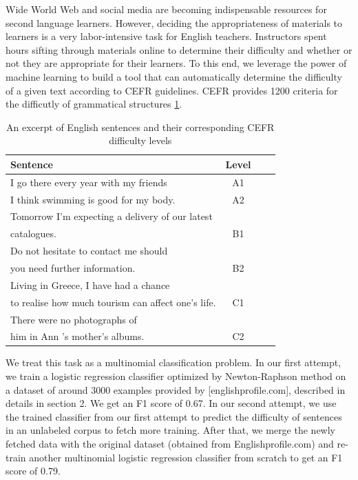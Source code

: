 Wide World Web and social media are becoming indispensable resources for second language learners. However, deciding the appropriateness of materials to learners is a very labor-intensive task for English teachers. Instructors spent hours sifting through materials online to determine their difficulty and whether or not they are appropriate for their learners. To this end, we leverage the power of machine learning to build a tool that can automatically determine the difficulty of a given text according to CEFR guidelines. 
CEFR provides 1200 criteria \citep{noauthor_english_nodate} for the difficutly of grammatical structures \ref{tab:cefr}.
\begin{table}
\caption{An excerpt of English sentences and their corresponding CEFR difficulty levels}
\centering
\begin{tabular}{l|c|c|c}
Sentence   & Level \\
\hline
I go there every year with my friends & A1 & \\
I think swimming is good for my body. & A2 & \\
Tomorrow I'm expecting a delivery of our latest\\ catalogues. & B1 & \\
Do not hesitate to contact me should \\you need further information. & B2 & \\
Living in Greece, I have had a chance \\to realise how much tourism can affect one's life. & C1 & \\
There were no photographs of \\him in Ann 's mother's albums. & C2 & \\
\end{tabular}
\label{tab:cefr}
\end{table}

We treat this task as a multinomial classification problem. In our first attempt, we train a logistic regression classifier optimized by Newton-Raphson method on a dataset of around 3000 examples provided by [englishprofile.com], described in details in section 2. We get an F1 score of 0.67. In our second attempt, we use the trained classifier from our first attempt to predict the difficulty of sentences in an unlabeled corpus to fetch more training. After that, we merge the newly fetched data with the original dataset (obtained from Englishprofile.com) and re-train another multinomial logistic regression classifier from scratch to get an F1 score of 0.79. 

